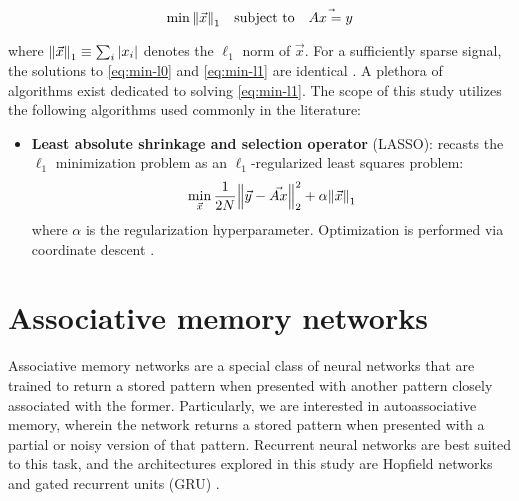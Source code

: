 \begin{equation}\label{eq:min-l1}
	\min \norm{\vec{x}}_1 \quad \textrm{subject to} \quad \vec{Ax = y}
\end{equation}

\noindent where $\norm{\vec{x}}_1 \equiv \sum_i \abs{x_i}$ denotes the $\ell_1$ norm of $\vec{x}$. For a sufficiently sparse signal, the solutions to \eqref{eq:min-l0} and \eqref{eq:min-l1} are identical \cite{Candes2006a}. A plethora of algorithms exist dedicated to solving \eqref{eq:min-l1}. The scope of this study utilizes the following algorithms used commonly in the literature:

\begin{itemize}
	\item \textbf{Least absolute shrinkage and selection operator} (LASSO): recasts the $\ell_1$ minimization problem as an $\ell_1$-regularized least squares problem:
	\begin{equation}
		\min_{\vec{x}} \frac{1}{2N} \norm{\vec{y} - \vec{Ax}}_2^2 + \alpha \norm{\vec{x}}_1
	\end{equation}
	where $\alpha$ is the regularization hyperparameter. Optimization is performed via coordinate descent \cite{scikit-learn}.
\end{itemize}


\section{Associative memory networks}
\label{sec:amnn}

Associative memory networks are a special class of neural networks that are trained to return a stored pattern when presented with another pattern closely associated with the former. Particularly, we are interested in autoassociative memory, wherein the network returns a stored pattern when presented with a partial or noisy version of that pattern. Recurrent neural networks are best suited to this task, and the architectures explored in this study are Hopfield networks \cite{Hopfield1982} and gated recurrent units (GRU) \cite{Cho2014}.